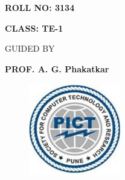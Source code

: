 \documentclass[12pt]{article}
\begin{document}
\begin{Center}
{\fontsize{16pt}{19.2pt}\selectfont \textbf{ROLL NO: 3134}\par}
\end{Center}\par

\begin{Center}
{\fontsize{16pt}{19.2pt}\selectfont \textbf{CLASS: TE-1}\par}
\end{Center}\par

\begin{Center}
{\fontsize{7pt}{8.4pt}\selectfont \textbf{ }\par}
\end{Center}\par

\begin{Center}
{\fontsize{14pt}{16.8pt}\selectfont GUIDED BY\par}
\end{Center}\par

\begin{Center}
{\fontsize{16pt}{19.2pt}\selectfont \textbf{PROF. A. G. Phakatkar}\par}
\end{Center}\par




\begin{figure}[H]
	\begin{Center}
		\includegraphics[width=1.57in,height=1.57in]{./media/image1.jpg}
	\end{Center}
\end{figure}



\tab \par

 \par
\end{document}
